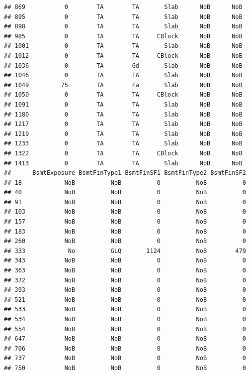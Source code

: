 \documentclass[]{article}
\begin{document}
\begin{verbatim}
## 869           0        TA        TA       Slab      NoB      NoB
## 895           0        TA        TA       Slab      NoB      NoB
## 898           0        TA        TA       Slab      NoB      NoB
## 985           0        TA        TA     CBlock      NoB      NoB
## 1001          0        TA        TA       Slab      NoB      NoB
## 1012          0        TA        TA     CBlock      NoB      NoB
## 1036          0        TA        Gd       Slab      NoB      NoB
## 1046          0        TA        TA       Slab      NoB      NoB
## 1049         75        TA        Fa       Slab      NoB      NoB
## 1050          0        TA        TA     CBlock      NoB      NoB
## 1091          0        TA        TA       Slab      NoB      NoB
## 1180          0        TA        TA       Slab      NoB      NoB
## 1217          0        TA        TA       Slab      NoB      NoB
## 1219          0        TA        TA       Slab      NoB      NoB
## 1233          0        TA        TA       Slab      NoB      NoB
## 1322          0        TA        TA     CBlock      NoB      NoB
## 1413          0        TA        TA       Slab      NoB      NoB
##      BsmtExposure BsmtFinType1 BsmtFinSF1 BsmtFinType2 BsmtFinSF2
## 18            NoB          NoB          0          NoB          0
## 40            NoB          NoB          0          NoB          0
## 91            NoB          NoB          0          NoB          0
## 103           NoB          NoB          0          NoB          0
## 157           NoB          NoB          0          NoB          0
## 183           NoB          NoB          0          NoB          0
## 260           NoB          NoB          0          NoB          0
## 333            No          GLQ       1124          NoB        479
## 343           NoB          NoB          0          NoB          0
## 363           NoB          NoB          0          NoB          0
## 372           NoB          NoB          0          NoB          0
## 393           NoB          NoB          0          NoB          0
## 521           NoB          NoB          0          NoB          0
## 533           NoB          NoB          0          NoB          0
## 534           NoB          NoB          0          NoB          0
## 554           NoB          NoB          0          NoB          0
## 647           NoB          NoB          0          NoB          0
## 706           NoB          NoB          0          NoB          0
## 737           NoB          NoB          0          NoB          0
## 750           NoB          NoB          0          NoB          0

\end{verbatim}
\end{document}
